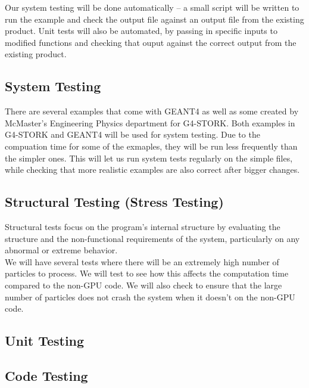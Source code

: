 \documentclass[12pt]{article}
\begin{document}
Our system testing will be done automatically -- a small script will be written to run the example and check the output file against an output file from the existing product. Unit tests will also be automated, by passing in specific inputs to modified functions and checking that ouput against the correct output from the existing product.\\ 

\subsection{System Testing} %
There are several examples that come with GEANT4 as well as some created by McMaster's Engineering Physics department for G4-STORK. Both examples in G4-STORK and GEANT4 will be used for system testing. Due to the compuation time for some of the exmaples, they will be run less frequently than the simpler ones. This will let us run system tests regularly on the simple files, while checking that more realistic examples are also correct after bigger changes.

\subsection{Structural Testing (Stress Testing)} %
Structural tests focus on the program's internal structure by evaluating the structure and the non-functional requirements of the system, particularly on any abnormal or extreme behavior.\\ 

We will have several tests where there will be an extremely high number of particles to process. We will test to see how this affects the computation time compared to the non-GPU code. We will also check to ensure that the large number of particles does not crash the system when it doesn't on the non-GPU code.

\subsection{Unit Testing} %


\subsection{Code Testing} %
\end{document}
